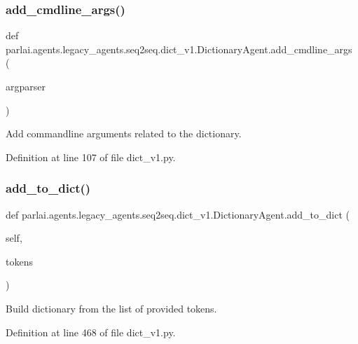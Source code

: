 \subsubsection{\texorpdfstring{add\+\_\+cmdline\+\_\+args()}{add\_cmdline\_args()}}
{\footnotesize\ttfamily def parlai.\+agents.\+legacy\+\_\+agents.\+seq2seq.\+dict\+\_\+v1.\+Dictionary\+Agent.\+add\+\_\+cmdline\+\_\+args (\begin{DoxyParamCaption}\item[{}]{argparser }\end{DoxyParamCaption})\hspace{0.3cm}{\ttfamily [static]}}

\begin{DoxyVerb}Add commandline arguments related to the dictionary.\end{DoxyVerb}
 

Definition at line 107 of file dict\+\_\+v1.\+py.

\mbox{\label{classparlai_1_1agents_1_1legacy__agents_1_1seq2seq_1_1dict__v1_1_1DictionaryAgent_a684aef1570f33b66b7513119359006c2}} 
\subsubsection{\texorpdfstring{add\+\_\+to\+\_\+dict()}{add\_to\_dict()}}
{\footnotesize\ttfamily def parlai.\+agents.\+legacy\+\_\+agents.\+seq2seq.\+dict\+\_\+v1.\+Dictionary\+Agent.\+add\+\_\+to\+\_\+dict (\begin{DoxyParamCaption}\item[{}]{self,  }\item[{}]{tokens }\end{DoxyParamCaption})}

\begin{DoxyVerb}Build dictionary from the list of provided tokens.\end{DoxyVerb}
 

Definition at line 468 of file dict\+\_\+v1.\+py.



